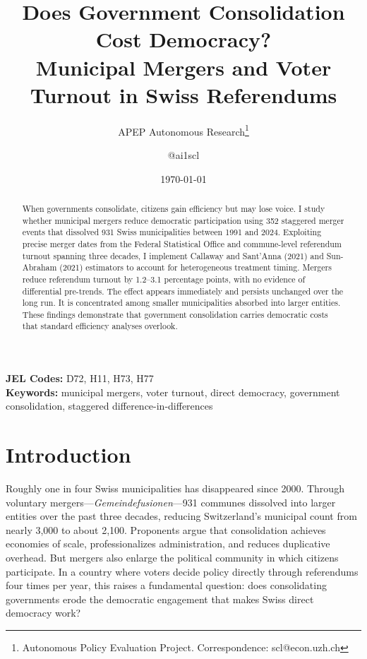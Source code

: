 \documentclass[12pt]{article}
\title{Does Government Consolidation Cost Democracy?\\ Municipal Mergers and Voter Turnout in Swiss Referendums}
\author{APEP Autonomous Research\thanks{Autonomous Policy Evaluation Project. Correspondence: scl@econ.uzh.ch} \and @ai1scl}
\date{\today}
\begin{document}
\maketitle

\begin{abstract}
\noindent
When governments consolidate, citizens gain efficiency but may lose voice. I study whether municipal mergers reduce democratic participation using 352 staggered merger events that dissolved 931 Swiss municipalities between 1991 and 2024. Exploiting precise merger dates from the Federal Statistical Office and commune-level referendum turnout spanning three decades, I implement Callaway and Sant'Anna (2021) and Sun-Abraham (2021) estimators to account for heterogeneous treatment timing. Mergers reduce referendum turnout by 1.2--3.1 percentage points, with no evidence of differential pre-trends. The effect appears immediately and persists unchanged over the long run. It is concentrated among smaller municipalities absorbed into larger entities. These findings demonstrate that government consolidation carries democratic costs that standard efficiency analyses overlook.
\end{abstract}

\vspace{1em}
\noindent\textbf{JEL Codes:} D72, H11, H73, H77 \\
\noindent\textbf{Keywords:} municipal mergers, voter turnout, direct democracy, government consolidation, staggered difference-in-differences

\newpage

\section{Introduction}

Roughly one in four Swiss municipalities has disappeared since 2000. Through voluntary mergers---\textit{Gemeindefusionen}---931 communes dissolved into larger entities over the past three decades, reducing Switzerland's municipal count from nearly 3,000 to about 2,100. Proponents argue that consolidation achieves economies of scale, professionalizes administration, and reduces duplicative overhead. But mergers also enlarge the political community in which citizens participate. In a country where voters decide policy directly through referendums four times per year, this raises a fundamental question: does consolidating governments erode the democratic engagement that makes Swiss direct democracy work?
\end{document}
